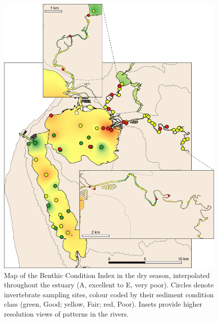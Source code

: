 \documentclass[
]{book}
\begin{document}
\begin{figure}
\includegraphics[width=1\linewidth]{images/BMI/picture14} \caption{Map of the Benthic Condition Index in the dry season, interpolated throughout the estuary (A, excellent to E, very poor). Circles denote invertebrate sampling sites, colour coded by their sediment condition class (green, Good; yellow, Fair; red, Poor). Insets provide higher resolution views of patterns in the rivers.}\label{fig:BMI-pic14}
\end{figure}
\end{document}
